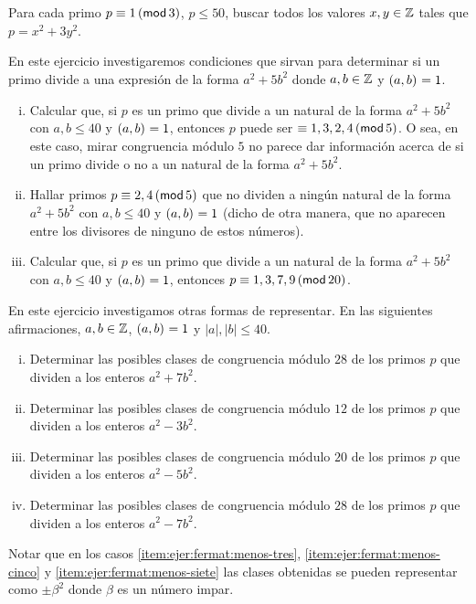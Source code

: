 \begin{ejerFermat}
	Para cada primo $p\equiv 1\tmodulo[3]$, $p\leq 50$, buscar todos los
	valores $x,y\in\Enteros$ tales que $p=x^2+3y^2$.
\end{ejerFermat}

\begin{ejerFermat}\label{ejer:fermat:cinco}
	En este ejercicio investigaremos condiciones que sirvan para
	determinar si un primo divide a una expresi\'on de la forma
	$a^2+5b^2$ donde $a,b\in\Enteros$ y $\mcd{a,b}=1$.
	\begin{enumerate}[(i)]
		\item\label{item:ejer:fermat:cinco:i}
			Calcular que, si $p$ es un primo que divide a un
			natural de la forma $a^2+5b^2$ con $a,b\leq 40$
			y $\mcd{a,b}=1$, entonces $p$ puede ser
			$\equiv 1,3,2,4\tmodulo[5]$.
			O sea, en este caso, mirar congruencia m\'odulo $5$
			no parece dar informaci\'on acerca de si un primo
			divide o no a un natural de la forma $a^2+5b^2$.
		\item\label{item:ejer:fermat:cinco:ii}
			Hallar primos $p\equiv 2,4\tmodulo[5]$ que no
			dividen a ning\'un natural de la forma $a^2+5b^2$
			con $a,b\leq 40$ y $\mcd{a,b}=1$
			(dicho de otra manera, que no aparecen entre los
			divisores de ninguno de estos n\'umeros).
		\item\label{item:ejer:fermat:cinco:iii}
			Calcular que, si $p$ es un primo que divide a un
			natural de la forma $a^2+5b^2$ con $a,b\leq 40$
			y $\mcd{a,b}=1$, entonces
			$p\equiv 1,3,7,9\tmodulo[20]$.
	\end{enumerate}
\end{ejerFermat}

\begin{ejerFermat}\label{ejer:fermat:otras}
	En este ejercicio investigamos otras formas de representar.
	En las siguientes afirmaciones, $a,b\in\Enteros$, $\mcd{a,b}=1$
	y $|a|,|b|\leq 40$.
	\begin{enumerate}[(i)]
		\item\label{item:ejer:fermat:siete}
			Determinar las posibles clases de congruencia
			m\'odulo $28$ de los primos $p$ que dividen a
			los enteros $a^2+7b^2$.
		\item\label{item:ejer:fermat:menos-tres}
			Determinar las posibles clases de congruencia
			m\'odulo $12$ de los primos $p$ que dividen a
			los enteros $a^2-3b^2$.
		\item\label{item:ejer:fermat:menos-cinco}
			Determinar las posibles clases de congruencia
			m\'odulo $20$ de los primos $p$ que dividen a
			los enteros $a^2-5b^2$.
		\item\label{item:ejer:fermat:menos-siete}
			Determinar las posibles clases de congruencia
			m\'odulo $28$ de los primos $p$ que dividen a
			los enteros $a^2-7b^2$.
	\end{enumerate}
	Notar que en los casos \eqref{item:ejer:fermat:menos-tres},
	\eqref{item:ejer:fermat:menos-cinco} y
	\eqref{item:ejer:fermat:menos-siete} las clases obtenidas se pueden
	representar como $\pm\beta^2$ donde $\beta$ es un n\'umero impar.
\end{ejerFermat}
